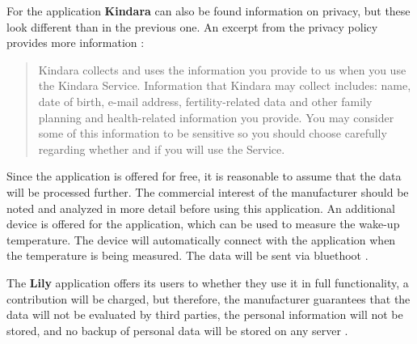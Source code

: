For the application \textbf{Kindara} can also be found information on privacy, but these look different than in the previous one. An excerpt from the privacy policy provides more information \cite{kindara}:
\begin{quote}
	Kindara collects and uses the information you provide to us when you use the Kindara Service. Information that Kindara may collect includes: name, date of birth, e-mail address, fertility-related data and other family planning and health-related information you provide. You may consider some of this information to be sensitive so you should choose carefully regarding whether and if you will use the Service.
\end{quote}
Since the application is offered for free, it is reasonable to assume that the data will be processed further. The commercial interest of the manufacturer should be noted and analyzed in more detail before using this application.
An additional device is offered for the application, which can be used to measure the wake-up temperature. The device will automatically connect with the application when the temperature is being measured. The data will be sent via bluethoot \cite{kindara}.

The \textbf{Lily} application offers its users to whether they use it in full functionality, a contribution will be charged, but therefore, the manufacturer guarantees that the data will not be evaluated by third parties, the personal information will not be stored, and no backup of personal data will be stored on any server \cite{lily}.

